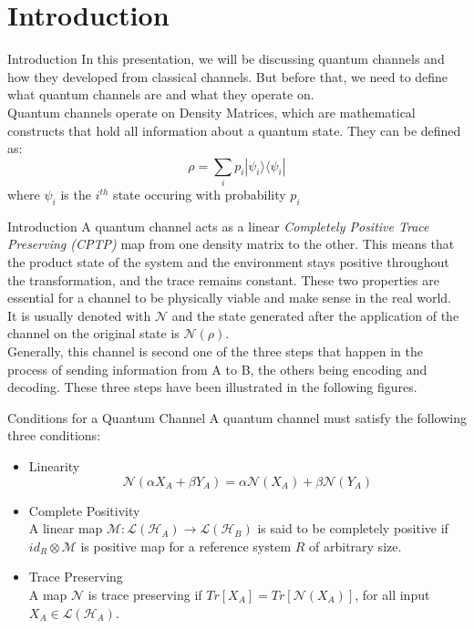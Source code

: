 \section{Introduction}

\begin{frame}{Introduction}
    In this presentation, we will be discussing quantum channels and how they developed from classical channels. But before that, we need to define what quantum channels
    are and what they operate on. \\
    Quantum channels operate on Density Matrices, which are mathematical constructs that hold all information about a quantum state. They can be defined as:
    \begin{equation*}
        \rho = \sum_{i}p_i | \psi_i \rangle \langle \psi_i |   
    \end{equation*}
    where $\psi_i$ is the $i^{th}$ state occuring with probability $p_i$
\end{frame}

\begin{frame}{Introduction}
    A quantum channel acts as a linear \textit{Completely Positive Trace Preserving (CPTP)} map from one density matrix to the other. This means that the product state
    of the system and the environment stays positive throughout the transformation, and the trace remains constant. These two properties are essential for a channel to
    be physically viable and make sense in the real world.\\
    It is usually denoted with $\mathcal{N}$ and the state generated after the application of the channel on the original state is $\mathcal{N} (\rho)$.\\
    Generally, this channel is second one of the three steps that happen in the process of sending information from A to B, the others being encoding and decoding.
    These three steps have been illustrated in the following figures.
\end{frame}

\begin{frame}{Conditions for a Quantum Channel}
    A quantum channel must satisfy the following three conditions:
    \begin{itemize}
        \item Linearity
            \begin{equation*}
                \mathcal{N}(\alpha X_A + \beta Y_A) = \alpha \mathcal{N}(X_A) + \beta \mathcal{N}(Y_A)
            \end{equation*}
        \item Complete Positivity \\
            A linear map $\mathcal{M} : \mathcal{L}(\mathcal{H}_A) \rightarrow \mathcal{L}(\mathcal{H}_B)$
            is said to be completely positive if $id_R \otimes \mathcal{M}$ is positive map for a reference
            system $R$ of arbitrary size.
        \item Trace Preserving \\
            A map $\mathcal{N}$ is trace preserving if $Tr[X_A] = Tr[\mathcal{N}(X_A)]$, for all input $X_A \in \mathcal{L}(\mathcal{H}_A)$.
    \end{itemize}
\end{frame}

